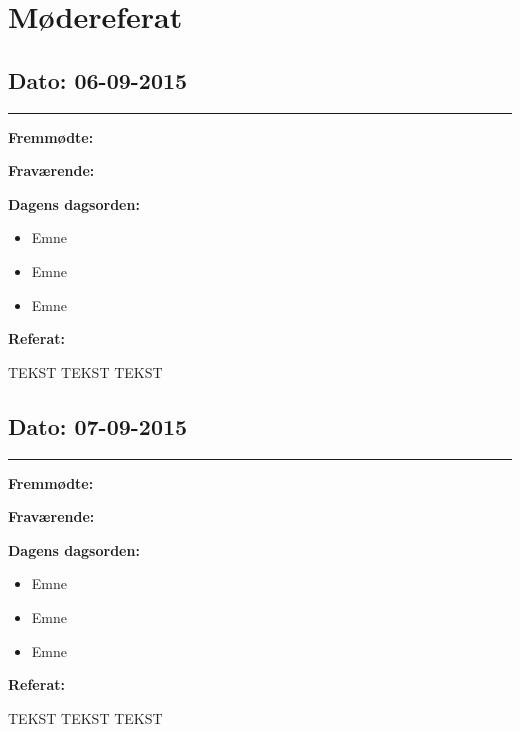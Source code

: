 \chapter{Mødereferat}

\section{Dato: 06-09-2015}
\hrule

\textbf{Fremmødte:} 

\textbf{Fraværende:}

\textbf{Dagens dagsorden:}
\begin{itemize}
	\item Emne
	\item Emne
	\item Emne
\end{itemize}

\textbf{Referat:}

TEKST TEKST TEKST




\section{Dato: 07-09-2015}
\hrule

\textbf{Fremmødte:} 

\textbf{Fraværende:}

\textbf{Dagens dagsorden:}
\begin{itemize}
	\item Emne
	\item Emne
	\item Emne
\end{itemize}

\textbf{Referat:}

TEKST TEKST TEKST